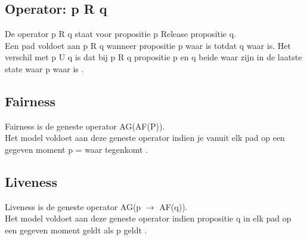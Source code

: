 \subsection{Operator: p R q}
De operator p R q staat voor propositie p Release propositie q. \\ Een pad voldoet aan p R q wanneer propositie p waar is totdat q waar is. Het verschil met p U q is dat bij p R q propositie p en q beide waar zijn in de laatste state waar p waar is \cite{modelchecking}. 
\subsection{Fairness}
Fairness is de geneste operator AG(AF(P)). \\ Het model voldoet aan deze geneste operator indien je vanuit elk pad op een gegeven moment p = waar tegenkomt \cite{modelchecking}.
\subsection{Liveness}
Liveness is de geneste operator AG(p $\to$ AF(q)). \\ Het model voldoet aan deze geneste operator indien propositie q in elk pad op een gegeven moment geldt als p geldt \cite{modelchecking}. 